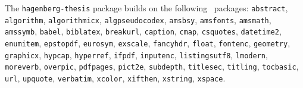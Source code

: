 \documentclass[english]{hgbarticle}
\begin{document}
\begin{sloppypar}
The \texttt{hagenberg-thesis} package builds on the following \latex\
packages:\newline
\texttt{abstract}, 
\texttt{algorithm}, 
\texttt{algorithmicx}, 
\texttt{algpseudocodex}, 
\texttt{amsbsy}, 
\texttt{amsfonts}, 
\texttt{amsmath}, 
\texttt{amssymb}, 
\texttt{babel}, 
\texttt{biblatex}, 
\texttt{breakurl}, 
\texttt{caption}, 
\texttt{cmap}, 
\texttt{csquotes}, 
\texttt{datetime2}, 
\texttt{enumitem}, 
\texttt{epstopdf}, 
\texttt{eurosym}, 
\texttt{exscale}, 
\texttt{fancyhdr}, 
\texttt{float}, 
\texttt{fontenc}, 
\texttt{geometry}, 
\texttt{graphicx}, 
\texttt{hypcap}, 
\texttt{hyperref}, 
\texttt{ifpdf}, 
\texttt{inputenc}, 
\texttt{listingsutf8}, 
\texttt{lmodern}, 
\texttt{moreverb}, 
\texttt{overpic}, 
\texttt{pdfpages}, 
\texttt{pict2e}, 
\texttt{subdepth}, 
\texttt{titlesec}, 
\texttt{titling},
\texttt{tocbasic},
\texttt{url}, 
\texttt{upquote}, 
\texttt{verbatim}, 
\texttt{xcolor}, 
\texttt{xifthen},
\texttt{xstring},
\texttt{xspace}.
\end{sloppypar}
\end{document}

